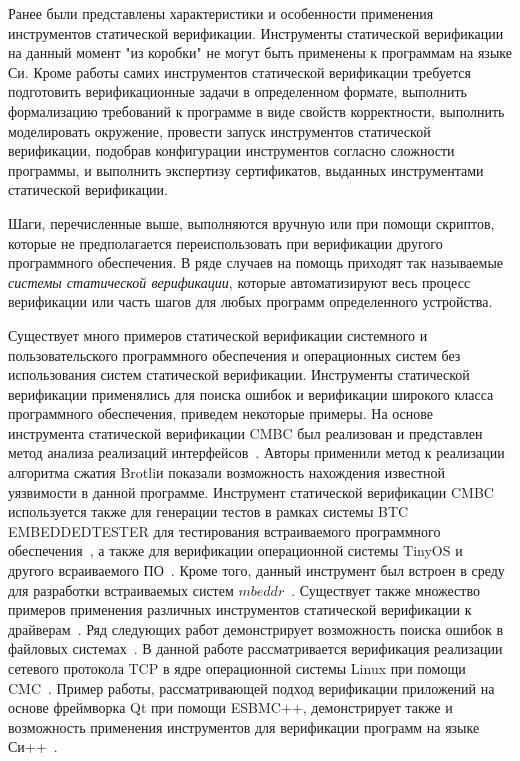 \documentclass[%
candidate,     %
href,        %
colorlinks,  %
]{disser}
\begin{document}

Ранее были представлены характеристики и особенности применения инструментов статической верификации.
Инструменты статической верификации на данный момент "из коробки" не могут быть применены к программам на языке Си.
Кроме работы самих инструментов статической верификации требуется подготовить верификационные задачи в определенном формате, выполнить формализацию требований к программе в виде свойств корректности, выполнить моделировать окружение, провести запуск инструментов статической верификации, подобрав конфигурации инструментов согласно сложности программы, и выполнить экспертизу сертификатов, выданных инструментами статической верификации.

Шаги, перечисленные выше, выполняются вручную или при помощи скриптов, которые не предполагается переиспользовать при верификации другого программного обеспечения.
В ряде случаев на помощь приходят так называемые \textit{системы статической верификации}, которые автоматизируют весь процесс верификации или часть шагов для любых программ определенного устройства.

Существует много примеров статической верификации системного и пользовательского программного обеспечения и операционных систем без использования систем статической верификации.
Инструменты статической верификации применялись для поиска ошибок и верификации широкого класса программного обеспечения, приведем некоторые примеры.
На основе инструмента статической верификации CMBC был реализован и представлен метод анализа реализаций интерфейсов~\cite{neville2016a}. Авторы применили метод к реализации алгоритма сжатия Brotli\footnotemark и показали возможность нахождения известной уязвимости в данной программе.
Инструмент статической верификации CMBC~\cite{CBMC} используется также для генерации тестов в рамках системы BTC EMBEDDEDTESTER для тестирования встраиваемого программного обеспечения~\cite{CMBCreuse}, а также для верификации операционной системы TinyOS и другого всраиваемого ПО~\cite{Schlich2009, Bucur:2010:SVT}. 
Кроме того, данный инструмент был встроен в среду для разработки встраиваемых систем $mbeddr$~\cite{mbeddr}. 
Существует также множество примеров применения различных инструментов статической верификации к драйверам~\cite{Post:2009:TAS,Witkowski:2007:MCC, ModelingLargeSystems, FlashDriver, ConcurBugsRakamaric}.
Ряд следующих работ демонстрирует возможность поиска ошибок в файловых системах~\cite{Galloway:2008:MLV, Yang:2006:UMC}.
В данной работе рассматривается верификация реализации сетевого протокола TCP в ядре операционной системы Linux при помощи CMC~\cite{Musuvathi:2004:MCL}.
Пример работы, рассматривающей подход верификации приложений на основе фреймворка Qt при помощи \mbox{ESBMC++}, демонстрирует также и возможность применения инструментов для верификации программ на языке Си++~\cite{QTverification}.
\end{document}
